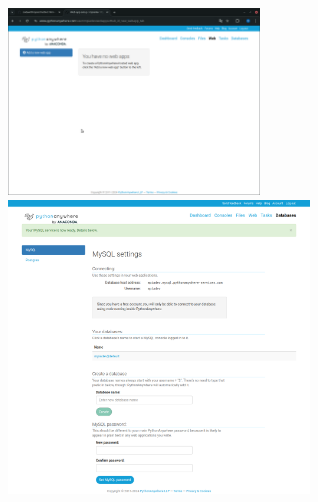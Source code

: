 \documentclass[a4paper,11pt]{article}
\begin{document}
        \includegraphics[width=0.5\textwidth]{PUBLICATION/screen9.png}
        \includegraphics[width=0.6\textwidth]{PUBLICATION/screen13.png}
\end{document}
